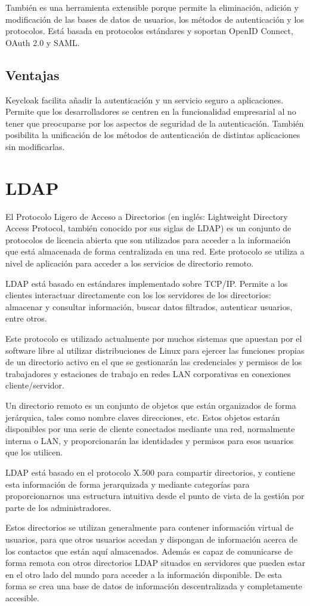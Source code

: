 	También es una herramienta extensible porque permite la eliminación, adición y modificación de las bases de datos de usuarios, los métodos de autenticación y los protocolos. Está basada en protocolos estándares y soportan OpenID Connect, OAuth 2.0 y SAML.
	
	\subsection{Ventajas}
	Keycloak facilita añadir la autenticación y un servicio seguro a aplicaciones. Permite que los desarrolladores se centren en la funcionalidad empresarial al no tener que preocuparse por los aspectos de seguridad de la autenticación. También posibilita la unificación de los métodos de autenticación de distintas aplicaciones sin modificarlas.
	
\section{LDAP}
El Protocolo Ligero de Acceso a Directorios (en inglés: Lightweight Directory Access Protocol, también conocido por sus siglas de LDAP) es un conjunto de protocolos de licencia abierta que son utilizados para acceder a la información que está almacenada de forma centralizada en una red. Este protocolo se utiliza a nivel de aplicación para acceder a los servicios de directorio remoto.

LDAP está basado en estándares implementado sobre TCP/IP. Permite a los clientes interactuar directamente con los los servidores de los directorios: almacenar y consultar información, buscar datos filtrados, autenticar usuarios, entre otros.

Este protocolo es utilizado actualmente por muchos sistemas que apuestan por el software libre al utilizar distribuciones de Linux para ejercer las funciones propias de un directorio activo en el que se gestionarán las credenciales y permisos de los trabajadores y estaciones de trabajo en redes LAN corporativas en conexiones cliente/servidor.

Un directorio remoto es un conjunto de objetos que están organizados de forma jerárquica, tales como nombre claves direcciones, etc. Estos objetos estarán disponibles por una serie de cliente conectados mediante una red, normalmente interna o LAN, y proporcionarán las identidades y permisos para esos usuarios que los utilicen.

LDAP está basado en el protocolo X.500 para compartir directorios, y contiene esta información de forma jerarquizada y mediante categorías para proporcionarnos una estructura intuitiva desde el punto de vista de la gestión por parte de los administradores.

Estos directorios se utilizan generalmente para contener información virtual de usuarios, para que otros usuarios accedan y dispongan de información acerca de los contactos que están aquí almacenados. Además es capaz de comunicarse de forma remota con otros directorios LDAP situados en servidores que pueden estar en el otro lado del mundo para acceder a la información disponible. De esta forma se crea una base de datos de información descentralizada y completamente accesible.